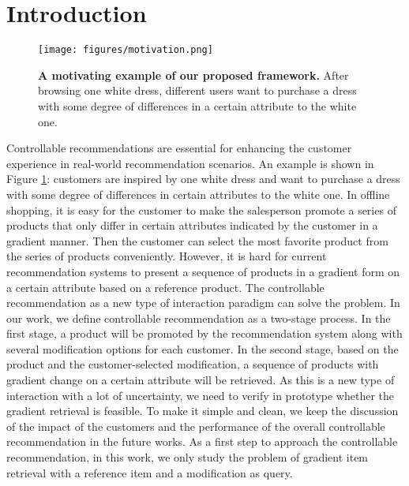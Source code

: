 \section{Introduction}
\label{sec:intro}

\begin{figure}[h!]
\centering
\texttt{[image: figures/motivation.png]}
\caption{\textbf{A motivating example of our proposed framework.} After browsing one white dress, different users want to purchase a dress with some degree of differences in a certain attribute to the white one. }
\label{fig:toy}
\end{figure}

Controllable recommendations are essential for enhancing the customer experience in real-world recommendation scenarios. An example is shown in Figure \ref{fig:toy}: customers are inspired by one white dress and want to purchase a dress with some degree of differences in certain attributes to the white one. In offline shopping, it is easy for the customer to make the salesperson promote a series of products that only differ in certain attributes indicated by the customer in a gradient manner. Then the customer can select the most favorite product from the series of products conveniently. However, it is hard for current recommendation systems to present a sequence of products in a gradient form on a certain attribute based on a reference product. The controllable recommendation as a new type of interaction paradigm can solve the problem. In our work, we define controllable recommendation as a two-stage process. In the first stage, a product will be promoted by the recommendation system along with several modification options for each customer. In the second stage, based on the product and the customer-selected modification, a sequence of products with gradient change on a certain attribute will be retrieved. As this is a new type of interaction with a lot of uncertainty, we need to verify in prototype whether the gradient retrieval is feasible. To make it simple and clean, we keep the discussion of the impact of the customers and the performance of the overall controllable recommendation in the future works. As a first step to approach the controllable recommendation, in this work, we only study the problem of gradient item retrieval with a reference item and a modification as query.

